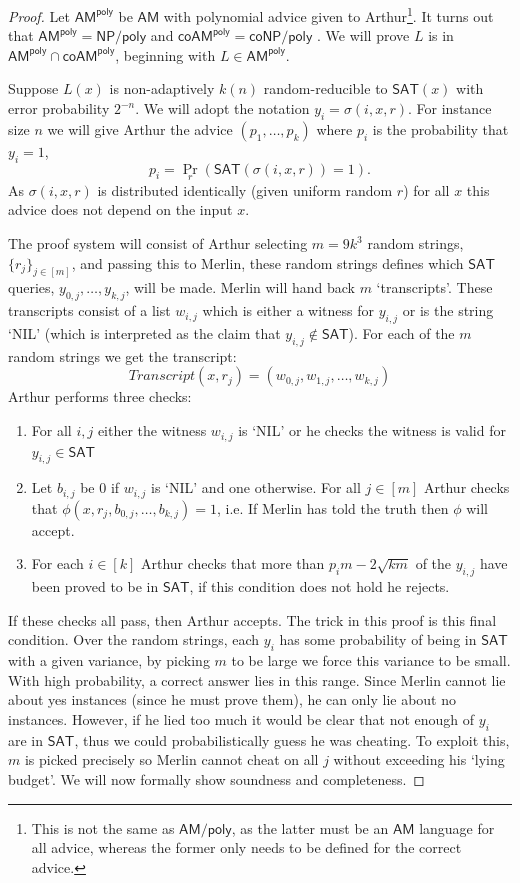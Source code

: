 \documentclass[10pt,a4paper]{article}
\begin{document}
\begin{proof}
    Let $\mathsf{AM^{poly}}$ be $\mathsf{AM}$ with polynomial advice given to Arthur\footnote{ This is not the same as $\mathsf{AM/poly}$, as the latter must be an $\mathsf{AM}$ language for all advice, whereas the former only needs to be defined for the correct advice.}. It turns out that $\mathsf{AM^{poly}=NP/poly}$ and $\mathsf{coAM^{poly}=coNP/poly}$ \cite{feigenbaum1990random}.
    We will prove $L$ is in $\mathsf{AM^{poly}\cap coAM^{poly}}$, beginning with $L \in \mathsf{AM^{poly}}$.

    Suppose $L(x)$ is non-adaptively $k(n)$ random-reducible to $\mathsf{SAT}(x)$ with error probability $2^{-n}$. We will adopt the notation $y_i=\sigma(i,x,r)$. For instance size $n$ we will give Arthur the advice $(p_1,\ldots, p_k)$ where $p_i$ is the probability that $y_i=1$,
    \[
    p_i=\Pr_{r}(\mathsf{SAT}(\sigma(i, x,r))=1).
    \]
    As $\sigma(i, x,r)$ is distributed identically (given uniform random $r$) for all $x$ this advice does not depend on the input $x$.

    The proof system will consist of Arthur selecting $m=9k^3$ random strings, $\{r_j\}_{j\in[m]}$, and passing this to Merlin, these random strings defines which $\mathsf{SAT}$ queries, $y_{0,j},\ldots, y_{k,j}$, will be made. Merlin will hand back $m$ `transcripts'. These transcripts consist of a list $w_{i,j}$ which is either a witness for $y_{i,j}$ or is the string `NIL' (which is interpreted as the claim that $y_{i,j}\notin \mathsf{SAT}$). For each of the $m$ random strings we get the transcript:
    \[
    Transcript(x,r_j)= (w_{0,j},w_{1,j}, \ldots, w_{k,j})
    \]
    Arthur performs three checks:
    \begin{enumerate}[label={(\arabic*)}]
        \item For all $i,j$ either the witness $w_{i,j}$ is `NIL' or he checks the witness is valid for $y_{i,j}\in \mathsf{SAT}$
        \item Let $b_{i,j}$ be 0 if $w_{i,j}$ is `NIL' and one otherwise. For all $j\in [m]$ Arthur checks that $\phi(x,r_j, b_{0,j}, \ldots, b_{k,j})=1$, i.e. If Merlin has told the truth then $\phi$ will accept.
        \item For each $i\in [k]$ Arthur checks that more than $p_im-2\sqrt{km}$ of the $y_{i,j}$ have been proved to be in $\mathsf{SAT}$, if this condition does not hold he rejects.
    \end{enumerate}
    If these checks all pass, then Arthur accepts. 
    The trick in this proof is this final condition. Over the random strings, each $y_i$ has some probability of being in $\mathsf{SAT}$ with a given variance, by picking $m$ to be large we force this variance to be small. With high probability, a correct answer lies in this range. Since Merlin cannot lie about yes instances (since he must prove them), he can only lie about no instances. However, if he lied too much it would be clear that not enough of $y_i$ are in $\mathsf{SAT}$, thus we could probabilistically guess he was cheating. To exploit this, $m$ is picked precisely so Merlin cannot cheat on all $j$ without exceeding his `lying budget'. We will now formally show soundness and completeness.


\end{proof}
\end{document}
